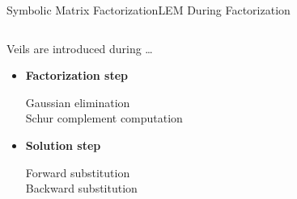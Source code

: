\begin{frame}{Symbolic Matrix Factorization}{\acs{LEM} During Factorization}
  \vspace{-2.0em}
  \begin{columns}
    \hspace{1.0em}
    \begin{column}[c]{0.425\textwidth}
      Veils are introduced during \dots
      \begin{itemize}
        \item<1> \textbf{Factorization step} \\
        \begin{small}
          \qquad Gaussian elimination \\
          \qquad Schur complement computation
        \end{small}
        \item<2> \textbf{Solution step} \\
        \begin{small}
          \qquad Forward substitution \\
          \qquad Backward substitution
        \end{small}
      \end{itemize}
    \end{column}
    \begin{column}[c]{0.4\textwidth}
      \vspace{-1.0em}
      \hspace{-1.0em}
\end{column}
\end{columns}
\end{frame}
